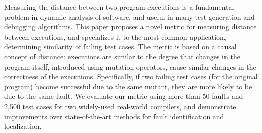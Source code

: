 Measuring the distance between two program executions is a fundamental problem in dynamic analysis of software, and useful in many test generation and debugging algorithms.  This paper proposes a novel metric for measuring distance between executions, and specializes it to the most common application, determining similarity of failing test cases.  The metric is based on a causal concept of distance: executions are similar to the degree that changes in the program itself, introduced using mutation operators, cause similar changes in the correctness of the executions.  Specifically, if two failing test cases (for the original program) become successful due to the same mutant, they are more likely to be due to the same fault.  We evaluate our metric using more than 50 faults and 2,500 test cases for two widely-used real-world compilers, and demonstrate improvements over state-of-the-art methods for fault identification and localization.  